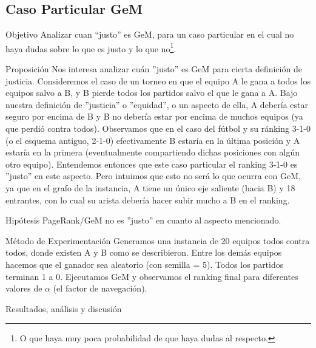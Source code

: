 \subsection{Caso Particular GeM}
\label{subsec:exp8}
\begin{LaTeXdescription}
    \item[Objetivo] Analizar cuan ``justo'' es GeM, para un caso particular en
        el cual no haya dudas sobre lo que es justo y lo que no\footnote{O que
        haya muy poca probabilidad de que haya dudas al respecto.}.\\

    \item[Proposici\'on] Nos interesa analizar cu\'an ''justo'' es GeM para
        cierta definici\'on de justicia. Consideremos el caso de un torneo en
        que el equipo A le gana a todos los equipos salvo a B, y B pierde todos
        los partidos salvo el que le gana a A. Bajo nuestra definición de
        ''justicia'' o ''equidad'', o un aspecto de ella, A deber\'ia estar
        seguro por encima de B y B no deber\'ia estar por encima de muchos
        equipos (ya que perdi\'o contra todos). Observamos que en el caso del
        f\'utbol y su ránking 3-1-0 (o el esquema antiguo, 2-1-0) efectivamente
        B estar\'ia en la \'ultima posici\'on y A estar\'ia en la primera
        (eventualmente compartiendo dichas posiciones con alg\'un otro equipo).
        Entendemos entonces que este caso particular el ranking 3-1-0 es
        ''justo'' en este aspecto. Pero intuimos que esto no ser\'a lo que
        ocurra con GeM, ya que en el grafo de la instancia, A tiene un \'unico
        eje saliente (hacia B) y 18 entrantes, con lo cual su arista deber\'ia
        hacer subir mucho a B en el ranking.\\

    \item[Hip\'otesis] PageRank/GeM no es ''justo'' en cuanto al aspecto
        mencionado.\\

    \item[M\'etodo de Experimentaci\'on] Generamos una instancia de 20 equipos
        todos contra todos, donde existen A y B como se describieron. Entre los
        dem\'as equipos hacemos que el ganador sea aleatorio (con semilla =
        5). Todos los partidos terminan 1 a 0. Ejecutamos GeM y observamos el
        ranking final para diferentes valores de $\alpha$ (el factor de
        navegaci\'on).\\

    \item[Resultados, an\'alisis y discusi\'on]
\end{LaTeXdescription}

